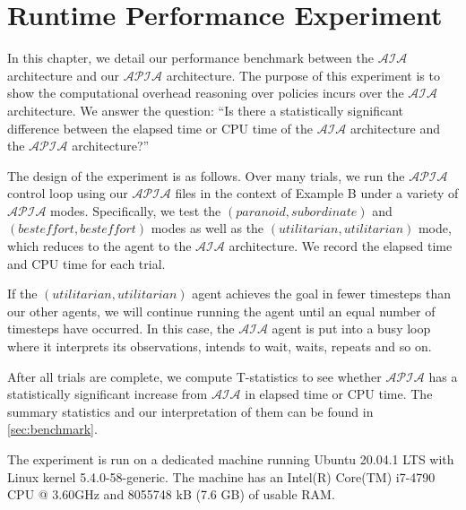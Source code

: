 \chapter{Runtime Performance Experiment}

%

In this chapter, we detail our performance benchmark between the $\mathcal{AIA}$ architecture and our $\mathcal{APIA}$ architecture.
The purpose of this experiment is to show the computational overhead reasoning over policies incurs over the $\mathcal{AIA}$ architecture.
We answer the question: ``Is there a statistically significant difference between the elapsed time or CPU time of the $\mathcal{AIA}$ architecture and the $\mathcal{APIA}$ architecture?''

The design of the experiment is as follows.
Over many trials, we run the $\mathcal{APIA}$ control loop using our $\mathcal{APIA}$ files in the context of Example B under a variety of $\mathcal{APIA}$ modes.
Specifically, we test the $(paranoid, subordinate)$ and $(best effort, best effort)$ modes as well as the $(utilitarian, utilitarian)$ mode, which reduces to the agent to the $\mathcal{AIA}$ architecture.
We record the elapsed time and CPU time for each trial.

If the $(utilitarian, utilitarian)$ agent achieves the goal in fewer timesteps than our other agents, we will continue running the agent until an equal number of timesteps have occurred.
In this case, the $\mathcal{AIA}$ agent is put into a busy loop where it interprets its observations, intends to wait, waits, repeats and so on.

After all trials are complete, we compute T-statistics to see whether $\mathcal{APIA}$ has a statistically significant increase from $\mathcal{AIA}$ in elapsed time or CPU time.
The summary statistics and our interpretation of them can be found in \cref{sec:benchmark}.

The experiment is run on a dedicated machine running Ubuntu 20.04.1 LTS with Linux kernel 5.4.0-58-generic.
The machine has an Intel(R) Core(TM) i7-4790 CPU @ 3.60GHz and 8055748 kB (7.6 GB) of usable RAM.
